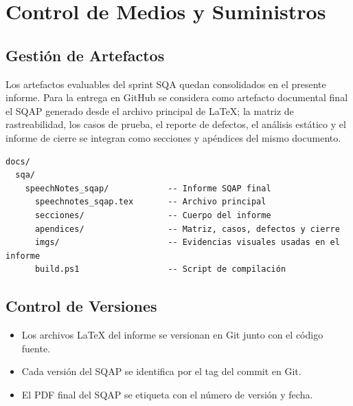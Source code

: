 \chapter{Control de Medios y Suministros}
\label{sec:control-medios}

\section{Gestión de Artefactos}
\label{sec:artefactos}

Los artefactos evaluables del sprint SQA quedan consolidados en el presente informe. Para la entrega en GitHub se considera como artefacto documental final el SQAP generado desde el archivo principal de LaTeX; la matriz de rastreabilidad, los casos de prueba, el reporte de defectos, el análisis estático y el informe de cierre se integran como secciones y apéndices del mismo documento.

\begin{verbatim}
docs/
  sqa/
    speechNotes_sqap/            -- Informe SQAP final
      speechnotes_sqap.tex       -- Archivo principal
      secciones/                 -- Cuerpo del informe
      apendices/                 -- Matriz, casos, defectos y cierre
      imgs/                      -- Evidencias visuales usadas en el informe
      build.ps1                  -- Script de compilación
\end{verbatim}

\section{Control de Versiones}
\label{sec:versiones}

\begin{itemize}
    \item Los archivos LaTeX del informe se versionan en Git junto con el código fuente.
    \item Cada versión del SQAP se identifica por el tag del commit en Git.
    \item El PDF final del SQAP se etiqueta con el número de versión y fecha.
\end{itemize}
